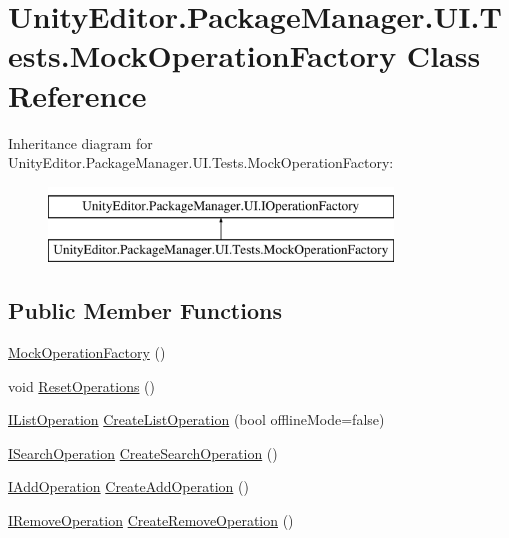 \hypertarget{class_unity_editor_1_1_package_manager_1_1_u_i_1_1_tests_1_1_mock_operation_factory}{}\section{Unity\+Editor.\+Package\+Manager.\+U\+I.\+Tests.\+Mock\+Operation\+Factory Class Reference}
\label{class_unity_editor_1_1_package_manager_1_1_u_i_1_1_tests_1_1_mock_operation_factory}
Inheritance diagram for Unity\+Editor.\+Package\+Manager.\+U\+I.\+Tests.\+Mock\+Operation\+Factory\+:\begin{figure}[H]
\begin{center}
\leavevmode
\includegraphics[height=2.000000cm]{class_unity_editor_1_1_package_manager_1_1_u_i_1_1_tests_1_1_mock_operation_factory}
\end{center}
\end{figure}
\subsection*{Public Member Functions}
\begin{DoxyCompactItemize}
\item 
\mbox{\hyperlink{class_unity_editor_1_1_package_manager_1_1_u_i_1_1_tests_1_1_mock_operation_factory_afbdf8caeca18b0dcb3b8669486cfde54}{Mock\+Operation\+Factory}} ()
\item 
void \mbox{\hyperlink{class_unity_editor_1_1_package_manager_1_1_u_i_1_1_tests_1_1_mock_operation_factory_a9f58ffa587113492f7124ae4e2974028}{Reset\+Operations}} ()
\item 
\mbox{\hyperlink{interface_unity_editor_1_1_package_manager_1_1_u_i_1_1_i_list_operation}{I\+List\+Operation}} \mbox{\hyperlink{class_unity_editor_1_1_package_manager_1_1_u_i_1_1_tests_1_1_mock_operation_factory_a23ac4569326a62c4913e285446e6e933}{Create\+List\+Operation}} (bool offline\+Mode=false)
\item 
\mbox{\hyperlink{interface_unity_editor_1_1_package_manager_1_1_u_i_1_1_i_search_operation}{I\+Search\+Operation}} \mbox{\hyperlink{class_unity_editor_1_1_package_manager_1_1_u_i_1_1_tests_1_1_mock_operation_factory_ac6f6ae337cc8eafb8726dcf7b697cdbe}{Create\+Search\+Operation}} ()
\item 
\mbox{\hyperlink{interface_unity_editor_1_1_package_manager_1_1_u_i_1_1_i_add_operation}{I\+Add\+Operation}} \mbox{\hyperlink{class_unity_editor_1_1_package_manager_1_1_u_i_1_1_tests_1_1_mock_operation_factory_a9c4cf5b39d2c0b78864aa0609a60a21d}{Create\+Add\+Operation}} ()
\item 
\mbox{\hyperlink{interface_unity_editor_1_1_package_manager_1_1_u_i_1_1_i_remove_operation}{I\+Remove\+Operation}} \mbox{\hyperlink{class_unity_editor_1_1_package_manager_1_1_u_i_1_1_tests_1_1_mock_operation_factory_a548fecbf2178df4f76eba8308584766c}{Create\+Remove\+Operation}} ()
\end{DoxyCompactItemize}
